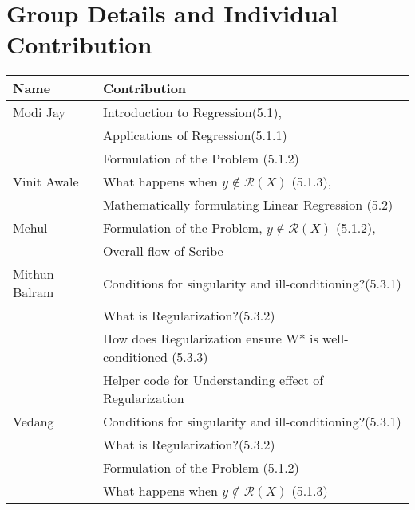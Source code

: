 \documentclass[11pt]{article}
\begin{document}
\section{Group Details and Individual Contribution}
\centering
\begin{tabular}{ |l|l|  }
 \hline
\textbf{Name} & \textbf{Contribution}
 \\
 \hline
 Modi Jay & Introduction to Regression(5.1), \\ &Applications of Regression(5.1.1)\\ &Formulation of the Problem (5.1.2)\\
 \hline
 Vinit Awale & What happens when $y \not \in \mathcal{R}(X)$ (5.1.3), \\    &Mathematically formulating Linear Regression (5.2) \\ 
 \hline
 Mehul & Formulation of the Problem, $y \not \in \mathcal{R}(X)$ (5.1.2),\\      &Overall flow of Scribe\\ 
 \hline
 Mithun Balram &Conditions for singularity and ill-conditioning?(5.3.1)\\
 &What is Regularization?(5.3.2)\\
 &How does Regularization ensure W* is well-conditioned (5.3.3)\\
 & Helper code for Understanding effect of Regularization \\
 \hline
 Vedang &Conditions for singularity and ill-conditioning?(5.3.1)\\ &What is Regularization?(5.3.2)\\ &Formulation of the Problem (5.1.2) \\&What happens when $y \not \in \mathcal{R}(X)$ (5.1.3)\\
 \hline
\end{tabular}
\end{document}
